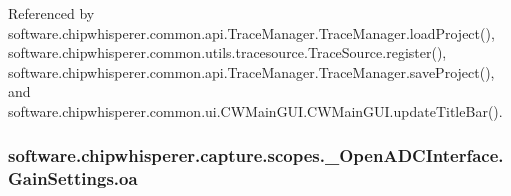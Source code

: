 Referenced by software.\+chipwhisperer.\+common.\+api.\+Trace\+Manager.\+Trace\+Manager.\+load\+Project(), software.\+chipwhisperer.\+common.\+utils.\+tracesource.\+Trace\+Source.\+register(), software.\+chipwhisperer.\+common.\+api.\+Trace\+Manager.\+Trace\+Manager.\+save\+Project(), and software.\+chipwhisperer.\+common.\+ui.\+C\+W\+Main\+G\+U\+I.\+C\+W\+Main\+G\+U\+I.\+update\+Title\+Bar().

\hypertarget{classsoftware_1_1chipwhisperer_1_1capture_1_1scopes_1_1__OpenADCInterface_1_1GainSettings_ab4a1ae0c6f8dca94fee4757314a227bd}{}
\subsubsection[{oa}]{\setlength{\rightskip}{0pt plus 5cm}software.\+chipwhisperer.\+capture.\+scopes.\+\_\+\+Open\+A\+D\+C\+Interface.\+Gain\+Settings.\+oa}\label{classsoftware_1_1chipwhisperer_1_1capture_1_1scopes_1_1__OpenADCInterface_1_1GainSettings_ab4a1ae0c6f8dca94fee4757314a227bd}


